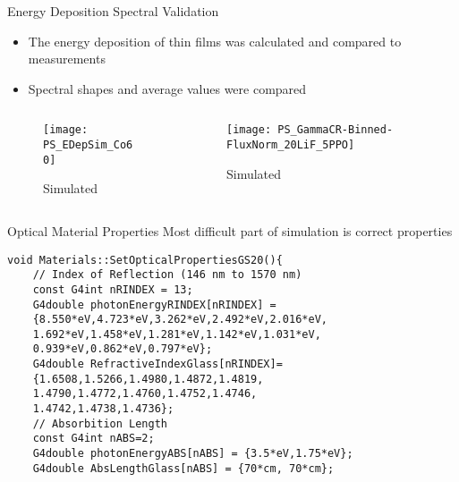 \begin{frame}{Energy Deposition Spectral Validation}
  \begin{itemize}
    \item The energy deposition of thin films was calculated and compared to measurements
    \item Spectral shapes and average values were compared
  \end{itemize}
  \begin{columns}[onlytextwidth]
  \begin{column}{0.45\textwidth}
    \centering
    \begin{figure}
    	\texttt{[image: PS\_EDepSim\_Co60]}
      \caption{Simulated}
    \end{figure}
  \end{column}
  \begin{column}{0.45\textwidth}
    \centering
    \begin{figure}
   	  \texttt{[image: PS\_GammaCR-Binned-FluxNorm\_20LiF\_5PPO]}
      \caption{Simulated}
    \end{figure}
  \end{column}
  \end{columns}
\hyperlink{G4Main}{}
\hyperlink{toc}{}
\end{frame}
\begin{frame}[fragile]{Optical Material Properties}
Most difficult part of simulation is correct properties
\begin{lstlisting}
void Materials::SetOpticalPropertiesGS20(){
    // Index of Reflection (146 nm to 1570 nm)
    const G4int nRINDEX = 13;
    G4double photonEnergyRINDEX[nRINDEX] = 
    {8.550*eV,4.723*eV,3.262*eV,2.492*eV,2.016*eV,
    1.692*eV,1.458*eV,1.281*eV,1.142*eV,1.031*eV, 
    0.939*eV,0.862*eV,0.797*eV};
    G4double RefractiveIndexGlass[nRINDEX]=
    {1.6508,1.5266,1.4980,1.4872,1.4819,    
    1.4790,1.4772,1.4760,1.4752,1.4746,    
    1.4742,1.4738,1.4736};
    // Absorbition Length
    const G4int nABS=2;
    G4double photonEnergyABS[nABS] = {3.5*eV,1.75*eV};
    G4double AbsLengthGlass[nABS] = {70*cm, 70*cm};  
\end{lstlisting}
\hyperlink{G4LightMain}{}
\hyperlink{toc}{}
\end{frame}
